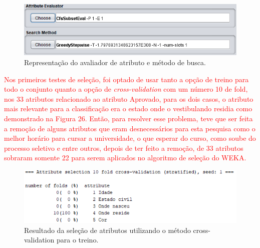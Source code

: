 \par
\begin{figure}[!htp]
	\begin{center}
    \caption{\label{fig:waveform_fig} Representação do avaliador de atributo e método de busca.}
	\includegraphics[scale=0.90]{Figuras/Avaliador_de_atributo.png}
	\end{center}
\end{figure}

\par
\textcolor{red}{Nos primeiros testes de seleção, foi optado de usar tanto a opção de treino para todo o conjunto quanto a opção de \textit{cross-validation} com um número 10 de fold, nos 33 atributos relacionado ao atributo Aprovado, para os dois casos, o atributo mais relevante para a classificação era o estado onde o vestibulando residia como demonstrado na Figura 26. Então, para resolver esse problema, teve que ser feita a remoção de alguns atributos que eram desnecessários para esta pesquisa como o melhor horário para cursar a universidade, o que esperar do curso, como soube do processo seletivo e entre outros, depois de ter feito a remoção, de 33 atributos sobraram somente 22 para serem aplicados no algoritmo de seleção do WEKA.}

\par
\begin{figure}[!htp]
	\begin{center}
    \caption{\label{fig:waveform_fig} Resultado da seleção de atributos utilizando o método cross-validation para o treino.}
	\includegraphics[scale=0.99]{Figuras/33_atributos.png}
	\end{center}
\end{figure}

\par
\textcolor{red}{}

